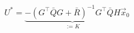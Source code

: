 \documentclass{article}
\begin{document}
\thispagestyle{empty}
$$
U^* = \underbrace{-(G^\top\bar{Q}G + \bar{R})^{-1}G^\top\bar{Q}H}_{:=K}\vec{x}_0
$$
\end{document}
